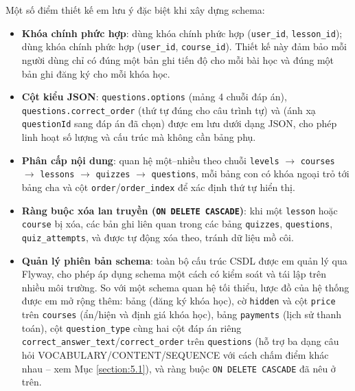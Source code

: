 \documentclass[../DoAn.tex]{subfiles}
\begin{document}
Một số điểm thiết kế em lưu ý đặc biệt khi xây dựng schema:

\begin{itemize}
    \item \textbf{Khóa chính phức hợp}: \texttt{} dùng khóa chính phức hợp (\texttt{user\_id}, \texttt{lesson\_id}); \texttt{} dùng khóa chính phức hợp (\texttt{user\_id}, \texttt{course\_id}). Thiết kế này đảm bảo mỗi người dùng chỉ có đúng một bản ghi tiến độ cho mỗi bài học và đúng một bản ghi đăng ký cho mỗi khóa học.
    \item \textbf{Cột kiểu JSON}: \texttt{questions.options} (mảng 4 chuỗi đáp án), \texttt{questions.correct\_order} (thứ tự đúng cho câu trình tự) và \texttt{} (ánh xạ \texttt{questionId} sang đáp án đã chọn) được em lưu dưới dạng JSON, cho phép linh hoạt số lượng và cấu trúc mà không cần bảng phụ.
    \item \textbf{Phân cấp nội dung}: quan hệ một--nhiều theo chuỗi \texttt{levels} \(\to\) \texttt{courses} \(\to\) \texttt{lessons} \(\to\) \texttt{quizzes} \(\to\) \texttt{questions}, mỗi bảng con có khóa ngoại trỏ tới bảng cha và cột \texttt{order}/\texttt{order\_index} để xác định thứ tự hiển thị.
    \item \textbf{Ràng buộc xóa lan truyền (\texttt{ON DELETE CASCADE})}: khi một \texttt{lesson} hoặc \texttt{course} bị xóa, các bản ghi liên quan trong các bảng \texttt{quizzes}, \texttt{questions}, \texttt{quiz\_attempts}, \texttt{} và \texttt{} được tự động xóa theo, tránh dữ liệu mồ côi.
    \item \textbf{Quản lý phiên bản schema}: toàn bộ cấu trúc CSDL được em quản lý qua Flyway, cho phép áp dụng schema một cách có kiểm soát và tái lập trên nhiều môi trường. So với một schema quan hệ tối thiểu, lược đồ của hệ thống được em mở rộng thêm: bảng \texttt{} (đăng ký khóa học), cờ \texttt{hidden} và cột \texttt{price} trên \texttt{courses} (ẩn/hiện và định giá khóa học), bảng \texttt{payments} (lịch sử thanh toán), cột \texttt{question\_type} cùng hai cột đáp án riêng \texttt{correct\_answer\_text}/\texttt{correct\_order} trên \texttt{questions} (hỗ trợ ba dạng câu hỏi VOCABULARY/CONTENT/SEQUENCE với cách chấm điểm khác nhau -- xem Mục \ref{section:5.1}), và ràng buộc \texttt{ON DELETE CASCADE} đã nêu ở trên.
\end{itemize}
\end{document}
